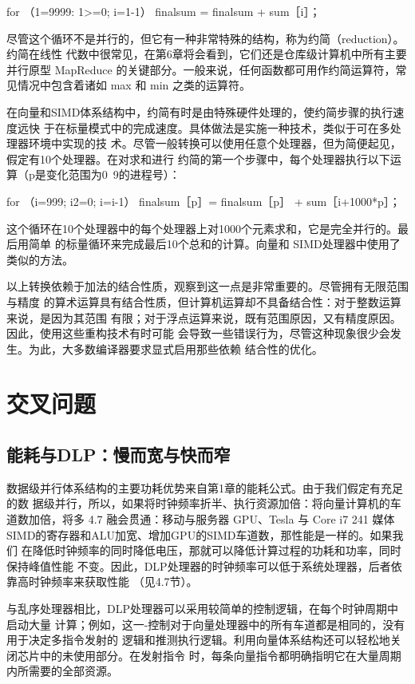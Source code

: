 for （1=9999: 1>=0; i=1-1）
finalsum = finalsum + sum［i］；

尽管这个循环不是并行的，但它有一种非常特殊的结构，称为约简（reduction）。约简在线性
代数中很常见，在第6章将会看到，它们还是仓库级计算机中所有主要并行原型 MapReduce
的关键部分。一般来说，任何函数都可用作约简运算符，常见情况中包含着诸如 max 和 min
之类的运算符。

在向量和SIMD体系结构中，约简有时是由特殊硬件处理的，使约简步骤的执行速度远快
于在标量模式中的完成速度。具体做法是实施一种技术，类似于可在多处理器环境中实现的技
术。尽管一般转换可以使用任意个处理器，但为简便起见，假定有10个处理器。在对求和进行
约简的第一个步骤中，每个处理器执行以下运算（p是变化范围为0~9的进程号）：

for （i=999; i2=0; i=i-1）
finalsum［p］= finalsum［p］ + sum［i+1000*p］；

这个循环在10个处理器中的每个处理器上对1000个元素求和，它是完全并行的。最后用简单
的标量循环来完成最后10个总和的计算。向量和 SIMD处理器中使用了类似的方法。

以上转换依赖于加法的结合性质，观察到这一点是非常重要的。尽管拥有无限范围与精度
的算术运算具有结合性质，但计算机运算却不具备结合性：对于整数运算来说，是因为其范围
有限；对于浮点运算来说，既有范围原因，又有精度原因。因此，使用这些重构技术有时可能
会导致一些错误行为，尽管这种现象很少会发生。为此，大多数编译器要求显式启用那些依赖
结合性的优化。

\section{交叉问题}

\subsection{能耗与DLP：慢而宽与快而窄}
数据级并行体系结构的主要功耗优势来自第1章的能耗公式。由于我们假定有充足的数
据级并行，所以，如果将时钟频率折半、执行资源加倍：将向量计算机的车道数加倍，将多
4.7 融会贯通：移动与服务器 GPU、Tesla 与 Core i7
241
媒体 SIMD的寄存器和ALU加宽、增加GPU的SIMD车道数，那性能是一样的。如果我们
在降低时钟频率的同时降低电压，那就可以降低计算过程的功耗和功率，同时保持峰值性能
不变。因此，DLP处理器的时钟频率可以低于系统处理器，后者依靠高时钟频率来获取性能
（见4.7节）。

与乱序处理器相比，DLP处理器可以采用较简单的控制逻辑，在每个时钟周期中启动大量
计算；例如，这一-控制对于向量处理器中的所有车道都是相同的，没有用于决定多指令发射的
逻辑和推测执行逻辑。利用向量体系结构还可以轻松地关闭芯片中的未使用部分。在发射指令
时，每条向量指令都明确指明它在大量周期内所需要的全部资源。

